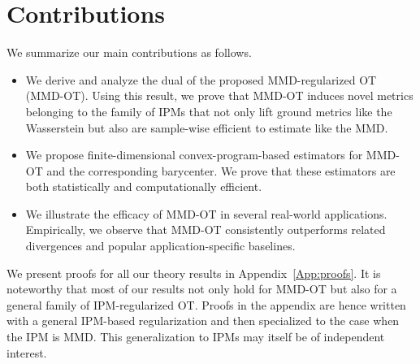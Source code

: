 \section{Contributions}
We summarize our main contributions as follows.
\begin{itemize}
    \item We derive and analyze the dual of the proposed MMD-regularized OT (MMD-OT). Using this result, we prove that MMD-OT induces novel metrics belonging to the family of IPMs that not only lift ground metrics like the Wasserstein but also are sample-wise efficient to estimate like the MMD.
    \item We propose finite-dimensional convex-program-based estimators for MMD-OT and the corresponding barycenter. We prove that these estimators are both statistically and computationally efficient.
    \item We illustrate the efficacy of MMD-OT in several real-world applications. Empirically, we observe that MMD-OT consistently outperforms related divergences and popular application-specific baselines. 
\end{itemize}
    We present proofs for all our theory results in Appendix~\ref{App:proofs}. It is noteworthy that most of our results not only hold for MMD-OT but also for a general family of IPM-regularized OT. Proofs in the appendix are hence written with a general IPM-based regularization and then specialized to the case when the IPM is MMD. This generalization to IPMs may itself be of independent interest.

